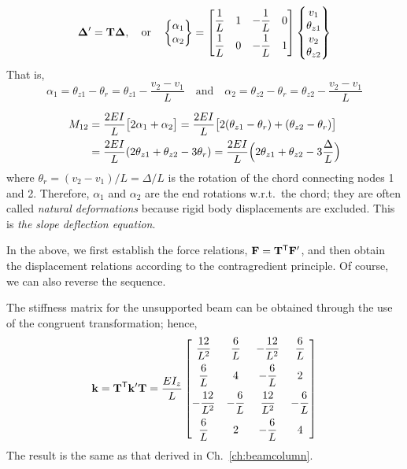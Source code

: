 \begin{example}
\begin{equation*}
  \bm{\Delta}' = \mathbf{T}\bm{\Delta},\quad\text{or}\quad
  \begin{Bmatrix}\alpha_1\\ \alpha_2\end{Bmatrix} = \begin{bmatrix}\dfrac1L & 1 & -\dfrac1L & 0\\[6pt] \dfrac1L & 0 & -\dfrac1L & 1\end{bmatrix}\begin{Bmatrix}v_1\\ \theta_{z1}\\ v_2\\ \theta_{z2}\end{Bmatrix}
\end{equation*}
That is,
\begin{equation*}
  \alpha_1 = \theta_{z1}-\theta_r = \theta_{z1}-\frac{v_2-v_1}{L}\quad\text{and}\quad
  \alpha_2 = \theta_{z2}-\theta_r = \theta_{z2}-\frac{v_2-v_1}{L}
\end{equation*}
\begin{fig}
  
\end{fig}
\begin{equation*}
  \begin{aligned}
  M_{12} &= \frac{2EI}{L}\bigl[2\alpha_1+\alpha_2\bigr] = \frac{2EI}{L}\bigl[2(\theta_{z1}-\theta_r)+(\theta_{z2}-\theta_r)\bigr]\\
         &= \frac{2EI}{L}(2\theta_{z1}+\theta_{z2}-3\theta_r) = \frac{2EI}{L}\Bigl(2\theta_{z1}+\theta_{z2}-3\frac{\Delta}{L}\Bigr)
  \end{aligned}
\end{equation*}
where $\theta_r = (v_2-v_1)/L = \Delta/L$ is the rotation of the chord connecting nodes 1 and 2. Therefore, $\alpha_1$ and $\alpha_2$ are the end rotations w.r.t.\ the chord; they are often called \emph{natural deformations} because rigid body displacements are excluded. This is \emph{the slope deflection equation}.

In the above, we first establish the force relations, $\mathbf{F} = \mathbf{T}^{\mathsf{T}}\mathbf{F}'$, and then obtain the displacement relations according to the contragredient principle. Of course, we can also reverse the sequence.

The stiffness matrix for the unsupported beam can be obtained through the use of the congruent transformation; hence,
\begin{equation*}
  \mathbf{k} = \mathbf{T}^{\mathsf{T}}\mathbf{k}'\mathbf{T} = \frac{EI_z}{L}
  \begin{bmatrix}
    \dfrac{12}{L^2} & \dfrac6L & -\dfrac{12}{L^2} & \dfrac6L\\[8pt]
    \dfrac6L & 4 & -\dfrac6L & 2\\[8pt]
    -\dfrac{12}{L^2} & -\dfrac6L & \dfrac{12}{L^2} & -\dfrac6L\\[8pt]
    \dfrac6L & 2 & -\dfrac6L & 4
  \end{bmatrix}
\end{equation*}
The result is the same as that derived in Ch.~\ref{ch:beamcolumn}.
\end{example}

